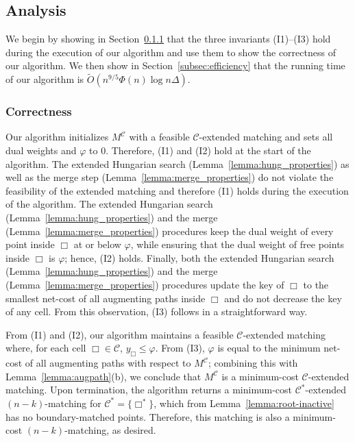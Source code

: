 \documentclass[11pt,onecolumn]{article}
\def\mcC{{\mathcal{C}}}
\newcommand{\cell}{\Box}
\newcommand{\ymax}{\varphi}
\begin{document}
\subsection{Analysis}\label{subsec:geometric-analysis}

We begin by showing in Section~\ref{sec:correctness} that the three invariants (I1)--(I3) hold during the execution of our algorithm and use them to show the correctness of our algorithm. We then show in Section~\ref{subsec:efficiency} that the running time of our algorithm is $\tilde{O}(n^{9/5}\Phi(n)\log n\Delta)$.





\subsubsection{Correctness}\label{sec:correctness}

Our algorithm initializes $M^{\mcC}$ with a feasible $\mcC$-extended matching and sets all dual weights and $\ymax$ to $0$. Therefore, (I1) and (I2) hold at the start of the algorithm. The extended Hungarian search (Lemma~\ref{lemma:hung_properties}) as well as the merge step (Lemma~\ref{lemma:merge_properties}) do not violate the feasibility of the extended matching and therefore (I1) holds during the execution of the algorithm. The extended Hungarian search (Lemma~\ref{lemma:hung_properties}) and the merge (Lemma~\ref{lemma:merge_properties}) procedures keep the dual weight of every point inside $\cell$ at or below $\ymax$, while ensuring that the dual weight of free points inside $\cell$ is $\ymax$; hence, (I2) holds. Finally, both the extended Hungarian search (Lemma~\ref{lemma:hung_properties}) and the merge (Lemma~\ref{lemma:merge_properties}) procedures update the key of $\cell$ to the smallest net-cost of all augmenting paths inside $\cell$ and do not decrease the key of any cell. From this observation, (I3) follows in a straightforward way.

From (I1) and (I2), our algorithm maintains a feasible $\mcC$-extended matching where, for each cell $\cell\in\mcC$, $y_\cell \le \ymax$. From (I3), $\ymax$ is equal to the minimum net-cost of all augmenting paths with respect to $M^{\mcC}$; combining this with Lemma~\ref{lemma:augpath}(b), we conclude that $M^{\mcC}$ is a minimum-cost $\mcC$-extended matching. Upon termination, the algorithm returns a minimum-cost $\mcC^*$-extended $(n-k)$-matching for $\mcC^*=\{\cell^*\}$, which from Lemma~\ref{lemma:root-inactive} has no boundary-matched points. Therefore, this matching is also a minimum-cost $(n-k)$-matching, as desired.
\end{document}
